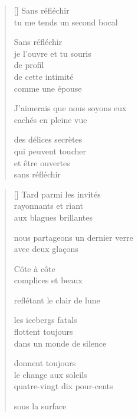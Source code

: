 \documentclass[12pt,a4paper]{article}
\begin{document}
\begin{verse}[\versewidth]
  Sans réfléchir \\
  tu me tends un second bocal

  Sans réfléchir \\
  je l'ouvre et tu souris \\
  de profil \\
  de cette intimité \\
  comme une épouse

  J'aimerais que nous soyons eux \\

  cachés en pleine vue

  des délices secrètes \\
  qui peuvent toucher \\
  et être ouvertes \\
  sans réfléchir
\end{verse}


\newpage

\poemtitle{}

\settowidth{\versewidth}{reflètant la lumière du jour}

\bigskip

\begin{verse}[\versewidth]
  Tard parmi les invités \\
  rayonnants et riant \\
  aux blagues brillantes

  nous partageons un dernier verre \\
  avec deux glaçons

  Côte à côte \\
  complices et beaux

  reflétant le clair de lune

  les icebergs fatals \\
  flottent toujours \\
  dans un monde de silence

  donnent toujours \\
  le change aux soleils \\
  quatre-vingt dix pour-cents

  sous la surface
\end{verse}


\newpage
\end{document}
